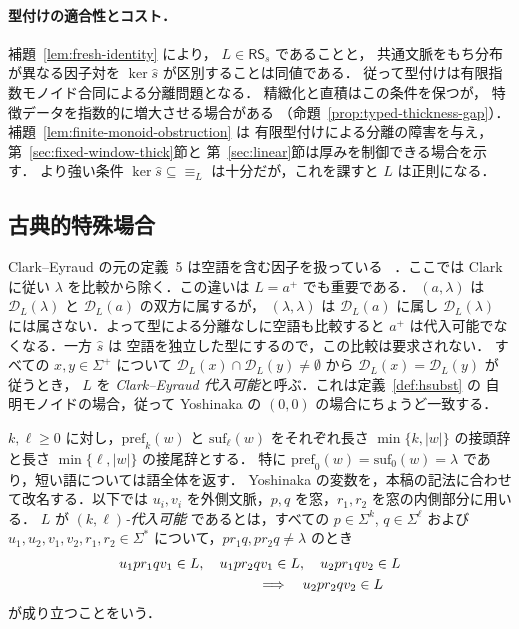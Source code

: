 \documentclass[11pt,a4paper]{ltjsarticle}
\theoremstyle{remark}
\theoremstyle{plain}
\newcommand{\D}{\mathcal{D}}
\newcommand{\pref}{\mathrm{pref}}
\newcommand{\suf}{\mathrm{suf}}
\begin{document}
\paragraph{型付けの適合性とコスト．}
補題~\ref{lem:fresh-identity} により，
$L\in\mathsf{RS}_s$ であることと，
共通文脈をもち分布が異なる因子対を
$\ker \widehat s$ が区別することは同値である．
従って型付けは有限指数モノイド合同による分離問題となる．
精緻化と直積はこの条件を保つが，
特徴データを指数的に増大させる場合がある
（命題~\ref{prop:typed-thickness-gap}）．
補題~\ref{lem:finite-monoid-obstruction} は
有限型付けによる分離の障害を与え，
第~\ref{sec:fixed-window-thick}節と
第~\ref{sec:linear}節は厚みを制御できる場合を示す．
より強い条件 $\ker \widehat s\subseteq\equiv_L$
は十分だが，これを課すと $L$ は正則になる．

\subsection{古典的特殊場合}

Clark--Eyraud の元の定義~5 は空語を含む因子を扱っている
~\cite{clark-eyraud2007}．ここでは Clark~\cite{clark2013} に従い
$\lambda$ を比較から除く．この違いは $L=a^+$ でも重要である．
$(a,\lambda)$ は $\D_L(\lambda)$ と $\D_L(a)$ の双方に属するが，
$(\lambda,\lambda)$ は $\D_L(a)$ に属し
$\D_L(\lambda)$ には属さない．よって型による分離なしに空語も比較すると
$a^+$ は代入可能でなくなる．一方 $\widehat s$ は
空語を独立した型にするので，この比較は要求されない．
すべての $x,y\in\Sigma^+$ について
$\D_L(x)\cap\D_L(y)\ne\emptyset$ から $\D_L(x)=\D_L(y)$ が従うとき，
$L$ を \emph{Clark--Eyraud 代入可能}と呼ぶ．これは定義~\ref{def:hsubst} の
自明モノイドの場合，従って Yoshinaka の $(0,0)$ の場合にちょうど一致する．

$k,\ell\ge0$ に対し，$\pref_k(w)$ と $\suf_\ell(w)$ をそれぞれ長さ
$\min\{k,|w|\}$ の接頭辞と長さ $\min\{\ell,|w|\}$ の接尾辞とする．
特に $\pref_0(w)=\suf_0(w)=\lambda$ であり，短い語については語全体を返す．
Yoshinaka の変数を，本稿の記法に合わせて改名する．以下では
$u_i,v_i$ を外側文脈，$p,q$ を窓，$r_1,r_2$ を窓の内側部分に用いる．
\hypertarget{def:kl-subst}{}$L$ が \emph{$(k,\ell)$-代入可能} であるとは，すべての
$p\in\Sigma^k$, $q\in\Sigma^\ell$ および
$u_1,u_2,v_1,v_2,r_1,r_2\in\Sigma^*$ について，$pr_1q,pr_2q\ne\lambda$ のとき
\[
\begin{split}
&u_1pr_1qv_1\in L,\quad u_1pr_2qv_1\in L,\quad
u_2pr_1qv_2\in L\\
&\hspace{35mm}\Longrightarrow\quad u_2pr_2qv_2\in L
\end{split}
\]
が成り立つことをいう．
\end{document}
